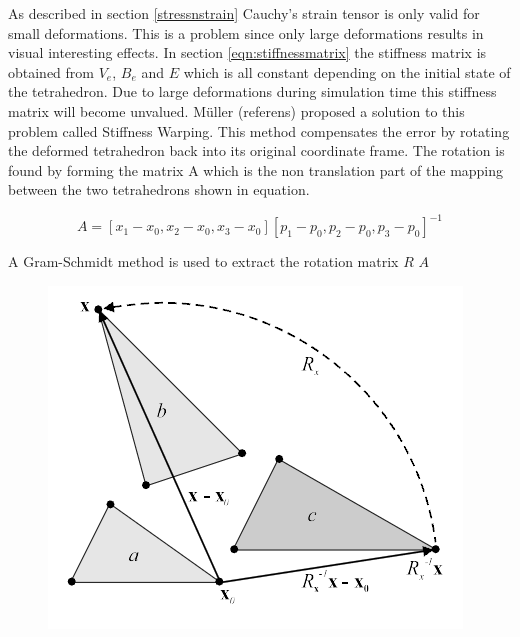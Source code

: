 As described in section \ref{stressnstrain} Cauchy’s strain tensor is only valid for small deformations. This is a problem since only large deformations results in visual interesting effects. In section \ref{eqn:stiffnessmatrix} the stiffness matrix is obtained from $V_{e}$, $B_{e}$ and $E$ which is all constant depending on the initial state of the tetrahedron. Due to large deformations during simulation time this stiffness matrix will become unvalued. M\"uller (referens) proposed a solution to this problem called Stiffness Warping. This method compensates the error by rotating the deformed tetrahedron back into its original coordinate frame. The rotation is found by forming the matrix A which is the non translation part of the mapping between the two tetrahedrons shown in equation.

\begin{equation}\label{eqn:mappedTetraMatrix}
    A = [x_{1}-x_{0}, x_{2}-x_{0}, x_{3}-x_{0}][p_{1}-p_{0}, p_{2}-p_{0}, p_{3}-p_{0}]^{-1}
\end{equation}

A Gram-Schmidt method is used to extract the rotation matrix $R$  $A$  

\begin{figure}[h]
\centering
\includegraphics[width=.5\columnwidth]{figures/warpedstiffness.png}
\caption{}
\label{fig:4}
\end{figure}